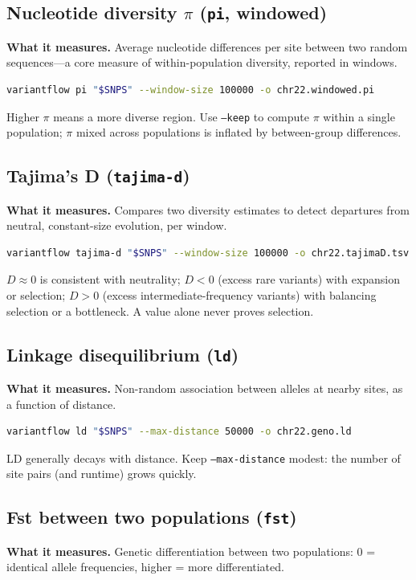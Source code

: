 \documentclass[11pt]{article}
\begin{document}
\subsection{Nucleotide diversity $\pi$ (\texttt{pi}, windowed)}
\textbf{What it measures.} Average nucleotide differences per site between two
random sequences---a core measure of within-population diversity, reported in
windows.
\begin{lstlisting}[language=bash]
variantflow pi "$SNPS" --window-size 100000 -o chr22.windowed.pi
\end{lstlisting}
Higher $\pi$ means a more diverse region. Use \texttt{--keep} to compute $\pi$
within a single population; $\pi$ mixed across populations is inflated by
between-group differences.

\subsection{Tajima's D (\texttt{tajima-d})}
\textbf{What it measures.} Compares two diversity estimates to detect departures
from neutral, constant-size evolution, per window.
\begin{lstlisting}[language=bash]
variantflow tajima-d "$SNPS" --window-size 100000 -o chr22.tajimaD.tsv
\end{lstlisting}
$D\approx 0$ is consistent with neutrality; $D<0$ (excess rare variants) with
expansion or selection; $D>0$ (excess intermediate-frequency variants) with
balancing selection or a bottleneck. A value alone never proves selection.

\subsection{Linkage disequilibrium (\texttt{ld})}
\textbf{What it measures.} Non-random association between alleles at nearby
sites, as a function of distance.
\begin{lstlisting}[language=bash]
variantflow ld "$SNPS" --max-distance 50000 -o chr22.geno.ld
\end{lstlisting}
LD generally decays with distance. Keep \texttt{--max-distance} modest: the number
of site pairs (and runtime) grows quickly.

\subsection{Fst between two populations (\texttt{fst})}
\textbf{What it measures.} Genetic differentiation between two populations: 0 =
identical allele frequencies, higher = more differentiated.
\end{document}
